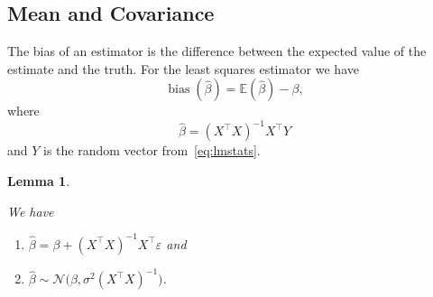 \documentclass[
  a4paper,
]{article}
\newtheorem{lemma}{Lemma}[section]
\theoremstyle{definition}
\theoremstyle{definition}
\theoremstyle{definition}
\theoremstyle{definition}
\theoremstyle{remark}
\begin{document}
\hypertarget{mean-and-covariance}{%
\subsection{Mean and Covariance}\label{mean-and-covariance}}

The bias of an estimator is the difference between the expected value
of the estimate and the truth. For the least squares estimator
we have
\begin{equation*}
  \mathop{\mathrm{bias}}(\hat\beta)
  = \mathbb{E}(\hat\beta) - \beta,
\end{equation*}
where
\begin{equation*}
  \hat\beta
  = (X^\top X)^{-1} X^\top Y
\end{equation*}
and \(Y\) is the random vector from~\eqref{eq:lmstats}.

\begin{lemma}
\protect\hypertarget{lem:hat-beta-dist}{}\label{lem:hat-beta-dist}

We have

\begin{enumerate}
\def\labelenumi{\arabic{enumi})}
\item
  \(\hat\beta = \beta + (X^\top X)^{-1} X^\top \varepsilon\) and
\item
  \(\hat\beta \sim \mathcal{N}\bigl( \beta, \sigma^2 (X^\top X)^{-1} \bigr)\).
\end{enumerate}

\end{lemma}
\end{document}
